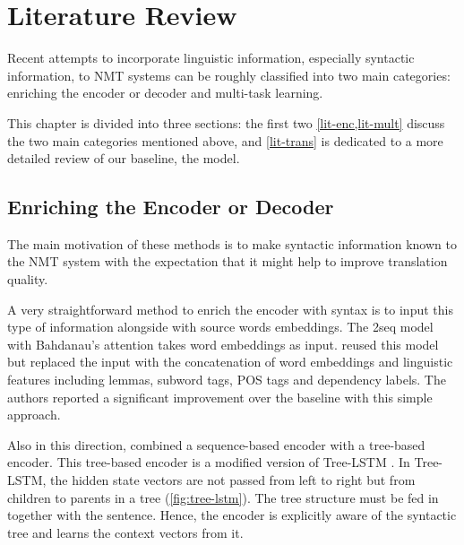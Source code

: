 \chapter{Literature Review}
\label{lit}

Recent attempts to incorporate linguistic information, especially syntactic information, to NMT systems can be roughly classified into two main categories: enriching the encoder or decoder and multi-task learning.

This chapter is divided into three sections: the first two \cref{lit-enc,lit-mult} discuss the two main categories mentioned above, and \cref{lit-trans} is dedicated to a more detailed review of our baseline, the \transformer model.

\section{Enriching the Encoder or Decoder}
\label{lit-enc}

The main motivation of these methods is to make syntactic information known to the NMT system with the expectation that it might help to improve translation quality.

A very straightforward method to enrich the encoder with syntax is to input this type of information alongside with source words embeddings.
The \seq2seq model with Bahdanau's attention takes word embeddings as input.
\cite{sennrich2016linguistic} reused this model but replaced the input with the concatenation of word embeddings and linguistic features including lemmas, subword tags, POS tags and dependency labels.
The authors reported a significant improvement over the baseline with this simple approach. 

Also in this direction, \cite{DBLP:conf/acl/EriguchiHT16} combined a sequence-based encoder with a tree-based encoder.
This tree-based encoder is a modified version of Tree-LSTM \citep{DBLP:conf/acl/TaiSM15}.
In Tree-LSTM, the hidden state vectors are not passed from left to right but from children to parents in a tree (\cref{fig:tree-lstm}).
The tree structure must be fed in together with the sentence.
Hence, the encoder is explicitly aware of the syntactic tree and learns the context vectors from it.

